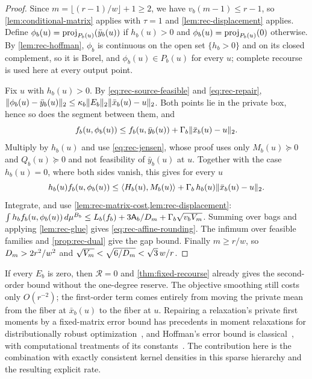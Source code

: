 \begin{proof}
Since $m=\lfloor(r-1)/w\rfloor+1\ge2$, we have $v_b(m-1)\le r-1$, so
\cref{lem:conditional-matrix} applies with $\tau=1$ and
\cref{lem:rec-displacement} applies. Define
$\phi_b(u)=\operatorname{proj}_{P_b(u)}(\bar y_b(u))$ if $h_b(u)>0$ and
$\phi_b(u)=\operatorname{proj}_{P_b(u)}(0)$ otherwise. By \cref{lem:rec-hoffman}, $\phi_b$
is continuous on the open set $\{h_b>0\}$ and on its closed complement, so
it is Borel, and $\phi_b(u)\in P_b(u)$ for every $u$; complete recourse is
used here at every output point.

Fix $u$ with $h_b(u)>0$. By \eqref{eq:rec-source-feasible} and
\eqref{eq:rec-repair}, $\lVert \phi_b(u)-\bar y_b(u)\rVert_2\le\kappa_b\lVert E_b\rVert_2
\lVert \bar x_b(u)-u\rVert_2$. Both points lie in the private box, hence so does
the segment between them, and
\[
  f_b(u,\phi_b(u))\le f_b(u,\bar y_b(u))+\Gamma_b\lVert \bar x_b(u)-u\rVert_2 .
\]
Multiply by $h_b(u)$ and use \eqref{eq:rec-jensen}, whose proof uses only
$M_b(u)\succeq0$ and $Q_b(u)\succeq0$ and not feasibility of $\bar y_b(u)$ at
$u$. Together with the case $h_b(u)=0$, where both sides vanish, this gives
for every $u$
\[
  h_b(u)f_b(u,\phi_b(u))\le\langle H_b(u),M_b(u)\rangle
  +\Gamma_b\,h_b(u)\lVert \bar x_b(u)-u\rVert_2 .
\]
Integrate, and use \cref{lem:rec-matrix-cost,lem:rec-displacement}:
$\int h_bf_b(u,\phi_b(u))\,d\mu^{B_b}\le L_b(f_b)+3\mathsf{A}_b/D_m
+\Gamma_b\sqrt{v_bV_m}$. Summing over bags and applying \cref{lem:rec-glue}
gives \eqref{eq:rec-affine-rounding}. The infimum over feasible families and
\cref{prop:rec-dual} give the gap bound. Finally $m\ge r/w$, so
$D_m>2r^2/w^2$ and $\sqrt{V_m}<\sqrt{6/D_m}<\sqrt3\,w/r$.
\end{proof}

If every $E_b$ is zero, then $\mathcal R=0$ and \cref{thm:fixed-recourse}
already gives the second-order bound without the one-degree reserve. The
objective smoothing still costs only $O(r^{-2})$; the first-order term comes
entirely from moving the private mean from the fiber at $\bar x_b(u)$ to the
fiber at $u$. Repairing a relaxation's private first moments by a
fixed-matrix error bound has precedents in moment relaxations for
distributionally robust optimization~\cite{zhang2025-wasserstein-moment}, and
Hoffman's error bound is classical~\cite{hoffman1952-approximate-solutions},
with computational treatments of its constants~\cite{pena2018-hoffman-constants}.
The contribution here is the combination with exactly consistent kernel
densities in this sparse hierarchy and the resulting explicit rate.

